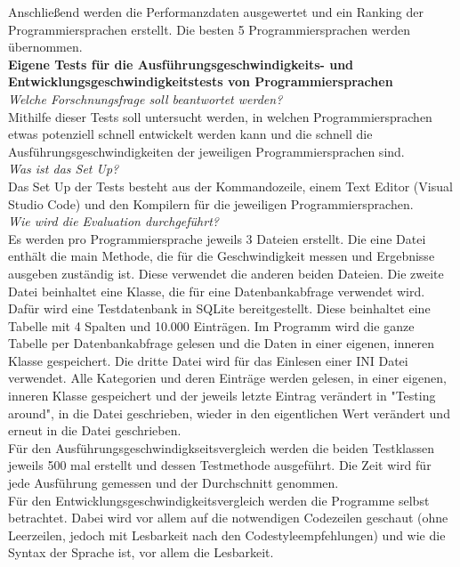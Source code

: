 \documentclass[ngerman]{article}
\begin{document}
    Anschließend werden die Performanzdaten ausgewertet und ein Ranking der Programmiersprachen erstellt. Die besten 5 Programmiersprachen werden übernommen.\\
    \textbf{Eigene Tests für die Ausführungsgeschwindigkeits- und Entwicklungsgeschwindigkeitstests von Programmiersprachen}\\
    \textit{Welche Forschnungsfrage soll beantwortet werden?}\\
    Mithilfe dieser Tests soll untersucht werden, in welchen Programmiersprachen etwas potenziell schnell entwickelt werden kann und die schnell die Ausführungsgeschwindigkeiten der jeweiligen Programmiersprachen sind.\\
    \textit{Was ist das Set Up?}\\
    Das Set Up der Tests besteht aus der Kommandozeile, einem Text Editor (Visual Studio Code) und den Kompilern für die jeweiligen Programmiersprachen.\\
    \textit{Wie wird die Evaluation durchgeführt?}\\
    Es werden pro Programmiersprache jeweils 3 Dateien erstellt. Die eine Datei enthält die main Methode, die für die Geschwindigkeit messen und Ergebnisse ausgeben zuständig ist. Diese verwendet die anderen beiden Dateien. Die zweite Datei beinhaltet eine Klasse, die für eine Datenbankabfrage verwendet wird. Dafür wird eine Testdatenbank in SQLite bereitgestellt. Diese beinhaltet eine Tabelle mit 4 Spalten und 10.000 Einträgen. Im Programm wird die ganze Tabelle per Datenbankabfrage gelesen und die Daten in einer eigenen, inneren Klasse gespeichert. Die dritte Datei wird für das Einlesen einer INI Datei verwendet. Alle Kategorien und deren Einträge werden gelesen, in einer eigenen, inneren Klasse gespeichert und der jeweils letzte Eintrag verändert in "Testing around", in die Datei geschrieben, wieder in den eigentlichen Wert verändert und erneut in die Datei geschrieben.\\
    Für den Ausführungsgeschwindigkseitsvergleich werden die beiden Testklassen jeweils 500 mal erstellt und dessen Testmethode ausgeführt. Die Zeit wird für jede Ausführung gemessen und der Durchschnitt genommen.\\
    Für den Entwicklungsgeschwindigkeitsvergleich werden die Programme selbst betrachtet. Dabei wird vor allem auf die notwendigen Codezeilen geschaut (ohne Leerzeilen, jedoch mit Lesbarkeit nach den Codestyleempfehlungen) und wie die Syntax der Sprache ist, vor allem die Lesbarkeit.\\
\end{document}
